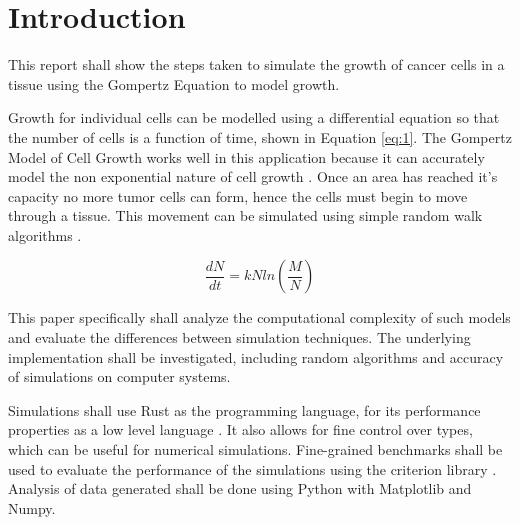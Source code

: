 \chapter{Introduction}

This report shall show the steps taken to simulate the growth of cancer cells in a tissue using the Gompertz Equation to model growth.

Growth for individual cells can be modelled using a differential equation so that the number of cells is a function of time, shown in Equation \ref{eq:1}.
The Gompertz Model of Cell Growth works well in this application because it can accurately model the non exponential nature of cell growth \autocite{tatroMathematicsCancerFitting2018}.
Once an area has reached it's capacity no more tumor cells can form, hence the cells must begin to move through a tissue.
This movement can be simulated using simple random walk algorithms \autocite{codlingRandomWalkModels2008}.

\begin{equation}
    \frac{dN}{dt} = kNln\left(\frac{M}{N} \right) \label{eq:1}
\end{equation}

This paper specifically shall analyze the computational complexity of such models and evaluate the differences between simulation techniques.
The underlying implementation shall be investigated, including random algorithms and accuracy of simulations on computer systems.

Simulations shall use Rust as the programming language, for its performance properties as a low level language \autocite{adamRustConciseOverview2023}.
It also allows for fine control over types, which can be useful for numerical simulations.
Fine-grained benchmarks shall be used to evaluate the performance of the simulations using the criterion library \autocite{heislerBheislerCriterionRs2024}.
Analysis of data generated shall be done using Python with Matplotlib and Numpy.